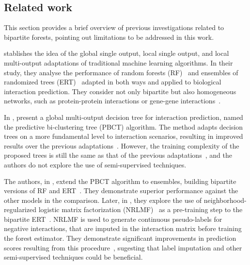 \begin{itemize}


\section{Related work}
\label{sec:related_work}


This section provides a brief overview of previous investigations related to bipartite forests, pointing out limitations to be addressed in this work.

 stablishes the idea of the global single output, local single output, and local multi-output adaptations of traditional machine learning algorithms. In their study, they analyse the performance of random forests (RF)~\cite{breiman2001random} and ensembles of randomized trees (ERT)~\cite{geurts2006extremely} adapted in both ways and applied to biological interaction prediction. They consider not only bipartite but also homogeneous networks, such as protein-protein interactions or gene-gene interactions~\cite{schrynemackers2015classifying}.

In \citeyear{pliakos2018global}, \citeauthor{pliakos2018global} present a global multi-output decision tree for interaction prediction, named the predictive bi-clustering tree (PBCT) algorithm.
The method adapts decision trees on a more fundamental level to interaction scenarios, resulting in improved results over the previous adaptations~\cite{pliakos2018global}.
However, the training complexity of the proposed trees is still the same as that of the previous adaptations~\cite{pliakos2018global}, and the authors do not explore the use of semi-supervised techniques.

The authors, in \citeyear{pliakos2019network}, extend the PBCT algorithm to ensembles, building bipartite versions of RF and ERT~\cite{pliakos2019network}. They demonstrate superior performance against the other models in the comparison.
%
Later, in \citeyear{pliakos2020drugtarget}, they explore the use of neighborhood-regularized logistic matrix factorization (NRLMF)~\cite{liu2016neighborhood} as a pre-training step to the bipartite ERT~\cite{pliakos2020drugtarget}. NRLMF is used to generate continuous pseudo-labels for negative interactions, that are imputed in the interaction matrix before training the forest estimator. They demonstrate significant improvements in prediction scores resulting from this procedure~\cite{pliakos2020drugtarget}, sugesting that label imputation and other semi-supervised techniques could be beneficial.


\end{itemize}
